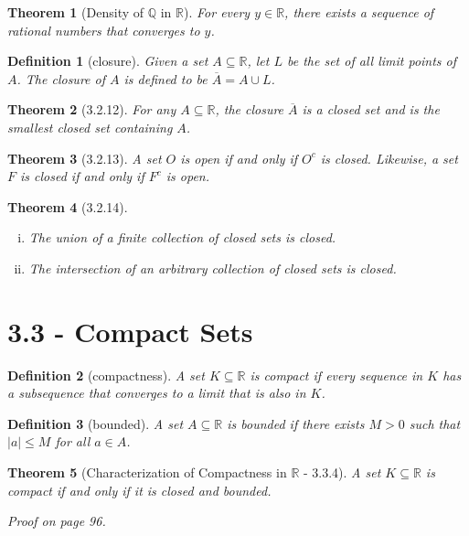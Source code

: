 \documentclass{article}
\newtheorem{definition}{Definition}
\newtheorem{theorem}{Theorem}
\begin{document}
\begin{theorem}[Density of $\mathbb{Q}$ in $\mathbb{R}$]
    For every $y \in \mathbb{R}$, there exists a sequence of rational numbers that converges to $y$.
\end{theorem}

\begin{definition}[closure]
    Given a set $A \subseteq \mathbb{R}$, let $L$ be the set of all limit points of $A$. The \textit{closure} of $A$ is defined to be $\overline{A}=A \cup L$.
\end{definition}


\begin{theorem}[3.2.12]
    For any $A \subseteq \mathbb{R}$, the closure $\overline{A}$ is a closed set and is the smallest closed set containing $A$.
\end{theorem}

\begin{theorem}[3.2.13]
    A set $O$ is open if and only if $O^c$ is closed. Likewise, a set $F$ is closed if and only if $F^c$ is open.
\end{theorem}

\begin{theorem}[3.2.14]
    \begin{enumerate}[(i)]
        \item The union of a finite collection of closed sets is closed.
        \item The intersection of an arbitrary collection of closed sets is closed.
    \end{enumerate}
\end{theorem}

\section*{3.3 - Compact Sets}
\begin{definition}[compactness]
    A set $K \subseteq \mathbb{R}$ is \textit{compact} if every sequence in $K$ has a subsequence that converges to a limit that is also in $K$.
\end{definition}

\begin{definition}[bounded]
    A set $A \subseteq \mathbb{R}$ is \textit{bounded} if there exists $M > 0$ such that $|a| \leq M$ for all $a \in A$.
\end{definition}

\begin{theorem}[Characterization of Compactness in $\mathbb{R}$ - 3.3.4]
    A set $K \subseteq \mathbb{R}$ is compact if and only if it is closed and bounded.

    Proof on page 96.
\end{theorem}
\end{document}
